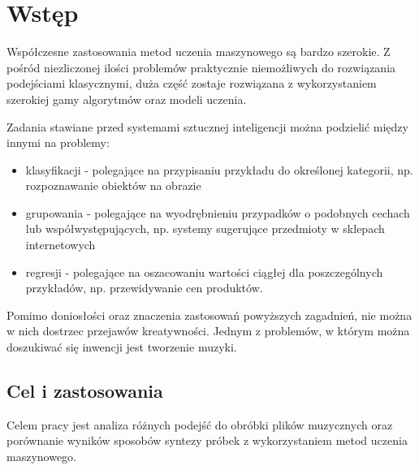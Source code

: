 
\chapter{Wstęp}
{




    Współczesne zastosowania metod uczenia maszynowego są bardzo szerokie.
    Z pośród niezliczonej ilości problemów praktycznie niemożliwych do rozwiązania podejściami klasycznymi, 
    duża część zostaje rozwiązana z wykorzystaniem szerokiej gamy algorytmów oraz modeli uczenia.
        
    Zadania stawiane przed systemami sztucznej inteligencji można podzielić między innymi na problemy:
    \begin{itemize}
        \item klasyfikacji - polegające na przypisaniu przykładu do określonej kategorii, 
        np. rozpoznawanie obiektów na obrazie 
        \item grupowania - polegające na wyodrębnieniu przypadków o podobnych cechach 
        lub współwystępujących, np. systemy sugerujące przedmioty w sklepach internetowych
        \item regresji - polegające na oszacowaniu wartości ciągłej dla poszczególnych przykładów, 
        np. przewidywanie cen produktów.
    \end{itemize}
    Pomimo doniosłości oraz znaczenia zastosowań powyższych zagadnień,
    nie można w nich dostrzec przejawów kreatywności.
    Jednym z problemów, w którym można doszukiwać się inwencji jest tworzenie muzyki.

    \section{Cel i zastosowania}
    {
        Celem pracy jest analiza różnych podejść do obróbki plików muzycznych oraz 
        porównanie wyników sposobów syntezy próbek z wykorzystaniem metod uczenia maszynowego. 

}}
